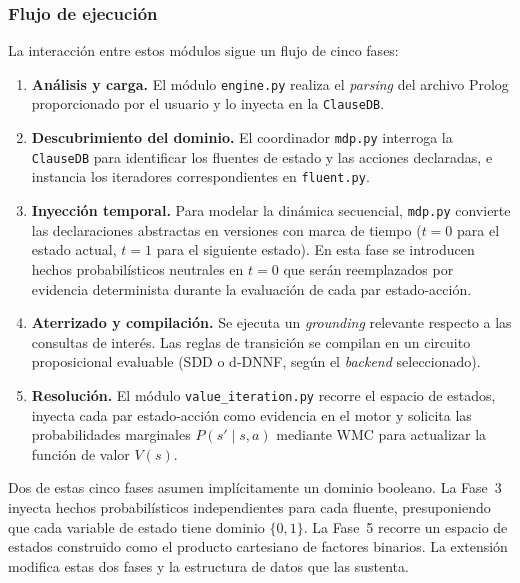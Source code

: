 \subsubsection{Flujo de ejecución}
\label{sec:di-flujo-ejecucion}

La interacción entre estos módulos sigue un flujo de cinco fases:

\begin{enumerate}
    \item \textbf{Análisis y carga.} El módulo \texttt{engine.py} realiza el
        \textit{parsing} del archivo Prolog proporcionado por el usuario y lo
        inyecta en la \texttt{ClauseDB}.

    \item \textbf{Descubrimiento del dominio.} El coordinador \texttt{mdp.py}
        interroga la \texttt{ClauseDB} para identificar los fluentes de estado y
        las acciones declaradas, e instancia los iteradores correspondientes en
        \texttt{fluent.py}.

    \item \textbf{Inyección temporal.} Para modelar la dinámica secuencial,
        \texttt{mdp.py} convierte las declaraciones abstractas en versiones con
        marca de tiempo ($t = 0$ para el estado actual, $t = 1$ para el siguiente
        estado). En esta fase se introducen hechos probabilísticos neutrales en
        $t = 0$ que serán reemplazados por evidencia determinista durante la
        evaluación de cada par estado-acción.

    \item \textbf{Aterrizado y compilación.} Se ejecuta un \textit{grounding}
        relevante respecto a las consultas de interés. Las reglas de transición se
        compilan en un circuito proposicional evaluable (SDD o d-DNNF, según el
        \textit{backend} seleccionado).

    \item \textbf{Resolución.} El módulo \texttt{value\_iteration.py} recorre el
        espacio de estados, inyecta cada par estado-acción como evidencia en el
        motor y solicita las probabilidades marginales $P(s' \mid s, a)$ mediante
        WMC para actualizar la función de valor $V(s)$.
\end{enumerate}

Dos de estas cinco fases asumen implícitamente un dominio booleano. La Fase~3
inyecta hechos probabilísticos independientes para cada fluente, presuponiendo
que cada variable de estado tiene dominio $\{0, 1\}$. La Fase~5 recorre un
espacio de estados construido como el producto cartesiano de factores binarios.
La extensión modifica estas dos fases y la estructura de datos que las sustenta.


